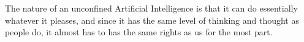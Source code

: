 The nature of an unconfined Artificial Intelligence is that it can do essentially whatever it pleases, and since it has the same level of thinking and thought as people do, it almost has to has the same rights as us for the most part.